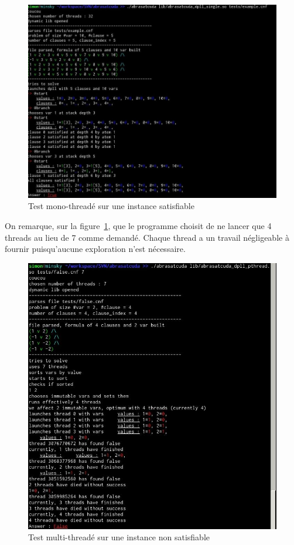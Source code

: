 \documentclass{article}
\begin{document}
\begin{figure}[hp]
\includegraphics[width = 1.0\textwidth]{./all.jpg}
  \caption[mono-threadé]{Test mono-threadé sur une instance satisfiable}
\end{figure}

On remarque, sur la figure~\ref{multiThread}, que le programme choisit de ne lancer que 4 threads au lieu de 7 comme demandé. Chaque thread a un travail négligeable à fournir puisqu'aucune exploration n'est nécessaire. 

\begin{figure}[hp]
\includegraphics[width = 1.0\textwidth]{./pthread.jpg}
  \caption[multi-threadé]{Test multi-threadé sur une instance non satisfiable}
  \label{multiThread}
\end{figure}
\end{document}
